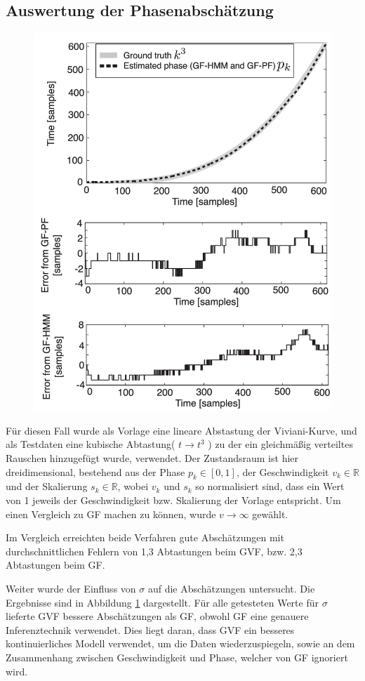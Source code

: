 \documentclass{llncs}
\begin{document}
\subsection{Auswertung der Phasenabschätzung}
\begin{figure}
\centering
\includegraphics[width=0.7\linewidth]{../Bilder/Fig6}
\caption{}
\label{fig:Fig6}
\end{figure}
Für diesen Fall wurde als Vorlage eine lineare Abstastung der Viviani-Kurve, und als Testdaten eine kubische Abtastung( $ t \rightarrow t^3 $ ) zu der ein gleichmäßig verteiltes Rauschen hinzugefügt wurde, verwendet. Der Zustandsraum ist hier dreidimensional, bestehend aus der Phase $ p_k \in [0,1] $, der Geschwindigkeit $v_k \in \mathbb{R}$ und der Skalierung $s_k \in \mathbb{R}$, wobei $v_k$ und $s_k$ so normalisiert sind, dass ein Wert von 1 jeweils der Geschwindigkeit bzw. Skalierung der Vorlage entspricht. Um einen Vergleich zu GF machen zu können, wurde $v \rightarrow \infty$ gewählt.

Im Vergleich erreichten beide Verfahren gute Abschätzungen mit durchschnittlichen Fehlern von 1,3 Abtastungen beim GVF, bzw. 2,3 Abtastungen beim GF.

Weiter wurde der Einfluss von $\sigma$ auf die Abschätzungen untersucht. Die Ergebnisse sind in Abbildung \ref{fig:Fig6} dargestellt. Für alle getesteten Werte für $\sigma$ lieferte GVF bessere Abschätzungen als GF, obwohl GF eine genauere Inferenztechnik verwendet. Dies liegt daran, dass GVF ein besseres kontinuierliches Modell verwendet, um die Daten wiederzuspiegeln, sowie an dem Zusammenhang zwischen Geschwindigkeit und Phase, welcher von GF ignoriert wird.
\end{document}
